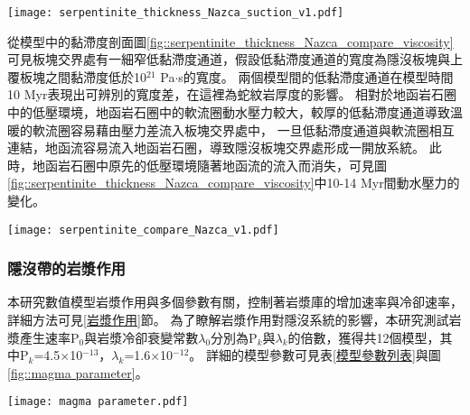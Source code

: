\begin{figure*}[ht!]
    \centering
    \texttt{[image: serpentinite\_thickness\_Nazca\_suction\_v1.pdf]}
    \caption[測試蛇紋岩厚度模型之動水壓力力矩]{測試蛇紋岩厚度模型之動水壓力力矩，模型與圖\ref{fig::slab_geometry_serpentinite_thickness_Nazca_top}所使用的圖例相同。}
    \label{fig::serpentinite_thickness_Nazca_suction}
\end{figure*}
從模型中的黏滯度剖面圖\ref{fig::serpentinite_thickness_Nazca_compare_viscosity}可見板塊交界處有一細窄低黏滯度通道，假設低黏滯度通道的寬度為隱沒板塊與上覆板塊之間黏滯度低於10$^{21}$ Pa$\cdot$s的寬度。
兩個模型間的低黏滯度通道在模型時間10 Myr表現出可辨別的寬度差，在這裡為蛇紋岩厚度的影響。
相對於地函岩石圈中的低壓環境，地函岩石圈中的軟流圈動水壓力較大，較厚的低黏滯度通道導致溫暖的軟流圈容易藉由壓力差流入板塊交界處中，
一旦低黏滯度通道與軟流圈相互連結，地函流容易流入地函岩石圈，導致隱沒板塊交界處形成一開放系統。
此時，地函岩石圈中原先的低壓環境隨著地函流的流入而消失，可見圖\ref{fig::serpentinite_thickness_Nazca_compare_viscosity}中10-14 Myr間動水壓力的變化。

\begin{figure*}[htp!]
    \centering
    \texttt{[image: serpentinite\_compare\_Nazca\_v1.pdf]}
    \caption[測試蛇紋岩厚度模型於5 Myr、10 Myr、12 Myr與14 Myr之黏滯度與動水壓力剖面]{測試蛇紋岩厚度模型於5 Myr、10 Myr、12 Myr與14 Myr之黏滯度與動水壓力剖面。(a)蛇紋岩厚度為5公里的模型黏滯度剖面。(b)蛇紋岩厚度為7.5公里的模型黏滯度剖面。(c)蛇紋岩厚度為5公里的模型動水壓力剖面。(d)蛇紋岩厚度為7.5公里的模型動水壓力剖面。}
    \label{fig::serpentinite_thickness_Nazca_compare_viscosity}
\end{figure*}

\newpage
\subsubsection{隱沒帶的岩漿作用}
本研究數值模型岩漿作用與多個參數有關，控制著岩漿庫的增加速率與冷卻速率，詳細方法可見\ref{岩漿作用}節。
為了瞭解岩漿作用對隱沒系統的影響，本研究測試岩漿產生速率P$_0$與岩漿冷卻衰變常數$\lambda_0$分別為P$_k$與$\lambda_k$的倍數，獲得共12個模型，其中P$_k$=4.5$\times$10$^{-13}$，$\lambda_k$=1.6$\times$10$^{-12}$。
詳細的模型參數可見表\ref{模型參數列表}與圖\ref{fig::magma parameter}。

\begin{figure*}[ht]
    \centering
    \texttt{[image: magma parameter.pdf]}
    \caption[智利模型岩漿參數測試示意圖，詳細岩漿參數見表\ref{模型參數列表}]{智利模型岩漿參數測試示意圖，詳細岩漿參數見表\ref{模型參數列表}。底部顏色為圖\ref{fig::magma_area_compare_Nazca}中的說明顏色。}
    \label{fig::magma parameter}
\end{figure*}

